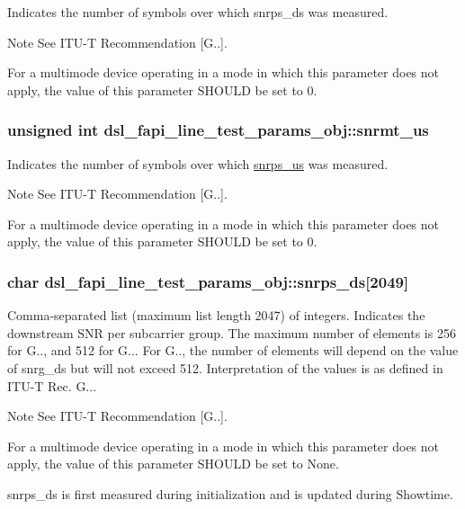 Indicates the number of symbols over which snrps\-\_\-ds was measured. \begin{DoxyNote}{Note}
See I\-T\-U-\/\-T Recommendation \mbox{[}G..\mbox{]}. 

For a multimode device operating in a mode in which this parameter does not apply, the value of this parameter S\-H\-O\-U\-L\-D be set to 0. 
\end{DoxyNote}
\hypertarget{structdsl__fapi__line__test__params__obj_adbbfa69841615a3fcd552726cc18a6a2}{
\subsubsection[{snrmt\-\_\-us}]{\setlength{\rightskip}{0pt plus 5cm}unsigned int dsl\-\_\-fapi\-\_\-line\-\_\-test\-\_\-params\-\_\-obj\-::snrmt\-\_\-us}}\label{structdsl__fapi__line__test__params__obj_adbbfa69841615a3fcd552726cc18a6a2}
Indicates the number of symbols over which \hyperlink{structdsl__fapi__line__test__params__obj_a2bb54209cc9ef6b6e17b57b723e59293}{snrps\-\_\-us} was measured. \begin{DoxyNote}{Note}
See I\-T\-U-\/\-T Recommendation \mbox{[}G..\mbox{]}. 

For a multimode device operating in a mode in which this parameter does not apply, the value of this parameter S\-H\-O\-U\-L\-D be set to 0. 
\end{DoxyNote}
\hypertarget{structdsl__fapi__line__test__params__obj_a31f5916b0efd18693c30ac5ab6bf95e0}{
\subsubsection[{snrps\-\_\-ds}]{\setlength{\rightskip}{0pt plus 5cm}char dsl\-\_\-fapi\-\_\-line\-\_\-test\-\_\-params\-\_\-obj\-::snrps\-\_\-ds\mbox{[}2049\mbox{]}}}\label{structdsl__fapi__line__test__params__obj_a31f5916b0efd18693c30ac5ab6bf95e0}
Comma-\/separated list (maximum list length 2047) of integers. Indicates the downstream S\-N\-R per subcarrier group. The maximum number of elements is 256 for G.., and 512 for G... For G.., the number of elements will depend on the value of snrg\-\_\-ds but will not exceed 512. Interpretation of the values is as defined in I\-T\-U-\/\-T Rec. G... \begin{DoxyNote}{Note}
See I\-T\-U-\/\-T Recommendation \mbox{[}G..\mbox{]}. 

For a multimode device operating in a mode in which this parameter does not apply, the value of this parameter S\-H\-O\-U\-L\-D be set to None. 

snrps\-\_\-ds is first measured during initialization and is updated during Showtime. 
\end{DoxyNote}
